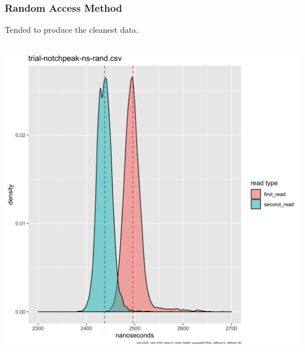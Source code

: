 \documentclass{beamer}
\begin{document}
\begin{frame}[t]
\begin{columns}
\begin{column}{0.5\textwidth}
  \end{column}

 \end{columns}

\end{frame}


\begin{frame}
 \frametitle{Random Access Method}
 Tended to produce the cleanest data.
 \begin{columns}
  \begin{column}{0.5\textwidth}
   \includegraphics[width=\linewidth]{trial-notchpeak-ns-rand-histogram.png}


\end{column}
\end{columns}
\end{frame}
\end{document}
